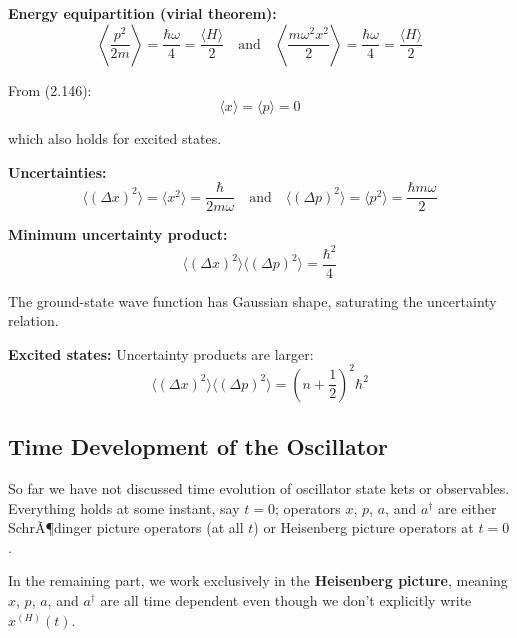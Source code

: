 \documentclass[11pt,a4paper]{article}
\begin{document}
\textbf{Energy equipartition (virial theorem):}
\begin{equation}
\left\langle\frac{p^2}{2m}\right\rangle = \frac{\hbar\omega}{4} = \frac{\langle H\rangle}{2} \quad \text{and} \quad \left\langle\frac{m\omega^2x^2}{2}\right\rangle = \frac{\hbar\omega}{4} = \frac{\langle H\rangle}{2}
\tag{2.157}
\end{equation}

From (2.146):
\begin{equation}
\langle x\rangle = \langle p\rangle = 0
\tag{2.158}
\end{equation}

which also holds for excited states.

\textbf{Uncertainties:}
\begin{equation}
\langle(\Delta x)^2\rangle = \langle x^2\rangle = \frac{\hbar}{2m\omega} \quad \text{and} \quad \langle(\Delta p)^2\rangle = \langle p^2\rangle = \frac{\hbar m\omega}{2}
\tag{2.159}
\end{equation}

\textbf{Minimum uncertainty product:}
\begin{equation}
\boxed{\langle(\Delta x)^2\rangle\langle(\Delta p)^2\rangle = \frac{\hbar^2}{4}}
\tag{2.160}
\end{equation}

The ground-state wave function has Gaussian shape, saturating the uncertainty relation.

\textbf{Excited states:}
Uncertainty products are larger:
\begin{equation}
\langle(\Delta x)^2\rangle\langle(\Delta p)^2\rangle = \left(n + \frac{1}{2}\right)^2\hbar^2
\tag{2.161}
\end{equation}

\subsection{Time Development of the Oscillator}

So far we have not discussed time evolution of oscillator state kets or observables. Everything holds at some instant, say $t = 0$; operators $x$, $p$, $a$, and $a^\dagger$ are either SchrÃ¶dinger picture operators (at all $t$) or Heisenberg picture operators at $t = 0$.

In the remaining part, we work exclusively in the \textbf{Heisenberg picture}, meaning $x$, $p$, $a$, and $a^\dagger$ are all time dependent even though we don't explicitly write $x^{(H)}(t)$.
\end{document}
